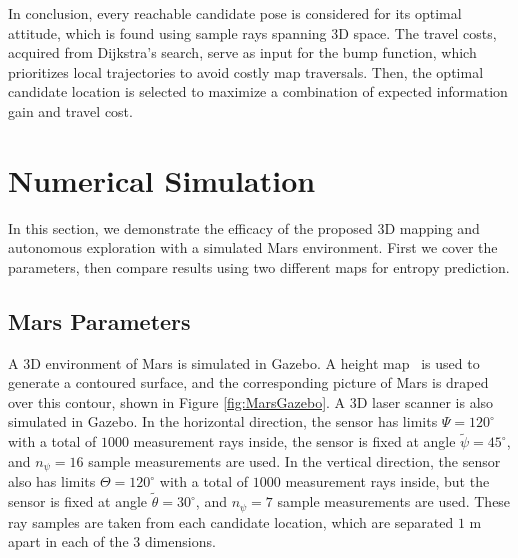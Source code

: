 In conclusion, every reachable candidate pose is considered for its optimal attitude, which is found using sample rays spanning 3D space. The travel costs, acquired from Dijkstra's search, serve as input for the bump function, which prioritizes local trajectories to avoid costly map traversals. Then, the optimal candidate location is selected to maximize a combination of expected information gain and travel cost.



\section{Numerical Simulation}
\label{sec:MarsSimulation}

In this section, we demonstrate the efficacy of the proposed 3D mapping and autonomous exploration with a simulated Mars environment. First we cover the parameters, then compare results using two different maps for entropy prediction.

\subsection{Mars Parameters}

A 3D environment of Mars is simulated in Gazebo. A height map~\cite{mapaplanet} is used to generate a contoured surface, and the corresponding picture of Mars is draped over this contour, shown in Figure \ref{fig:MarsGazebo}. A 3D laser scanner is also simulated in Gazebo. In the horizontal direction, the sensor has limits $\Psi=120^{\circ}$ with a total of $1000$ measurement rays inside, the sensor is fixed at angle $\tilde{\psi}=45^{\circ}$, and $n_\psi=16$ sample measurements are used. In the vertical direction, the sensor also has limits $\Theta=120^{\circ}$ with a total of $1000$ measurement rays inside, but the sensor is fixed at angle $\tilde{\theta}=30^{\circ}$, and $n_\psi=7$ sample measurements are used. These ray samples are taken from each candidate location, which are separated $1$ m apart in each of the $3$ dimensions.



